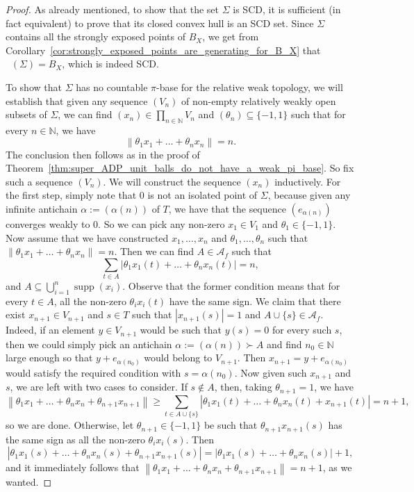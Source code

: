 \documentclass[11pt,a4paper,reqno]{amsart}
\numberwithin{equation}{section}
\newcommand{\abs}[1]{\left\lvert#1\right\rvert}
\newcommand{\norm}[1]{\left\lVert#1\right\rVert}
\newcommand{\N}{\mathbb{N}}
\newcommand{\A}{\mathcal{A}}
\DeclareMathOperator{\supp}{supp}
\DeclareMathOperator{\cconv}{\overline{conv}}
\newcommand{\1}{\mathbbm{1}}
\renewcommand{\geq}{\geqslant}
\theoremstyle{plain}
\theoremstyle{definition}
\begin{document}
\begin{proof}
As already mentioned, to show that the set $\Sigma$ is SCD, it is sufficient (in fact equivalent) to prove that its closed convex hull is an SCD set. Since $\Sigma$ contains all the strongly exposed points of $B_X$, we get from Corollary~\ref{cor:strongly_exposed_points_are_generating_for_B_X} that $\cconv(\Sigma)=B_X$, which is indeed SCD.

To show that $\Sigma$ has no countable $\pi$-base for the relative weak topology, we will establish that given any sequence $(V_n)$ of non-empty relatively weakly open subsets of $\Sigma$, we can find $(x_n)\in \prod_{n\in \N}V_n$ and $(\theta_n)\subseteq \{-1,1\}$ such that for every $n\in\N$, we have \begin{equation*}
    \norm{\theta_1x_1+\dots+\theta_nx_n}=n.
\end{equation*} The conclusion then follows as in the proof of Theorem~\ref{thm:super_ADP_unit_balls_do_not_have_a_weak_pi_base}. So fix such a sequence $(V_n)$. We will construct the sequence $(x_n)$ inductively. For the first step, simply note that 0 is not an isolated point of $\Sigma$, because given any infinite antichain $\alpha:=(\alpha(n))$ of $T$, we have that the sequence $(e_{\alpha(n)})$ converges weakly to 0. So we can pick any non-zero $x_1\in V_1$ and $\theta_1\in\{-1,1\}$. Now assume that we have constructed $x_1,\dots,x_n$ and $\theta_1,\dots,\theta_n$ such that $\norm{\theta_1x_1+\dots+\theta_nx_n}=n$. Then we can find $A\in\A_f$ such that \begin{equation*}
    \sum_{t\in A}\abs{\theta_1x_1(t)+\dots+\theta_nx_n(t)}=n,
\end{equation*} and $A\subseteq \bigcup_{i=1}^n\supp(x_i)$. Observe that the former condition means that for every $t\in A$, all the non-zero $\theta_ix_i(t)$ have the same sign. We claim that there exist $x_{n+1}\in V_{n+1}$ and $s\in T$ such that $\abs{x_{n+1}(s)}=1$ and $A\cup\{s\}\in\A_f$. Indeed, if an element $y\in V_{n+1}$ would be such that $y(s)=0$ for every such $s$, then we could simply pick an antichain $\alpha:=(\alpha(n))\succ A$ and find $n_0\in\N$ large enough so that $y+e_{\alpha(n_0)}$ would belong to $V_{n+1}$. Then $x_{n+1}=y+e_{\alpha(n_0)}$ would satisfy the required condition with $s=\alpha(n_0)$. Now given such $x_{n+1}$ and $s$, we are left with two cases to consider. If $s\notin A$, then, taking $\theta_{n+1}=1$, we have
\begin{equation*}
    \norm{\theta_1x_1+\dots+\theta_nx_n+\theta_{n+1}x_{n+1}} \geq \sum_{t\in A\cup\{s\}}\abs{\theta_1x_1(t)+\dots+\theta_nx_n(t)+x_{n+1}(t)}=n+1,
\end{equation*} so we are done. Otherwise, let $\theta_{n+1}\in\{-1,1\}$ be such that $\theta_{n+1}x_{n+1}(s)$ has the same sign as all the non-zero $\theta_ix_i(s)$. Then \begin{equation*}
    \abs{\theta_1x_1(s)+\dots+\theta_nx_n(s)+\theta_{n+1}x_{n+1}(s)}=\abs{\theta_1x_1(s)+\dots+\theta_nx_n(s)}+1,
\end{equation*} and it immediately follows that $\norm{\theta_1x_1+\dots+\theta_nx_n+\theta_{n+1}x_{n+1}}=n+1$, as we wanted.
\end{proof}
\end{document}

